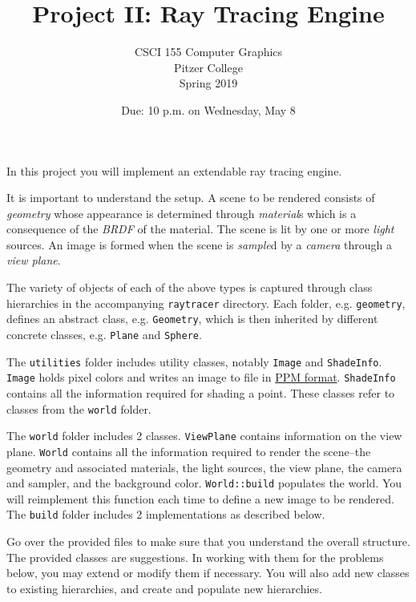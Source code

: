 \documentclass[addpoints]{exam}
\title{Project II: Ray Tracing Engine}
\author{CSCI 155 Computer Graphics\\Pitzer College\\Spring 2019}
\date{Due: 10 p.m. on Wednesday, May 8}
\begin{document}
\maketitle
\thispagestyle{empty}

In this project you will implement an extendable ray tracing engine.

It is important to understand the setup. A scene to be rendered consists of \emph{geometry} whose appearance is determined through \emph{material}s which is a consequence of the \emph{BRDF} of the material. The scene is lit by one or more \emph{light} sources. An image is formed when the scene is \emph{sample}d by a \emph{camera} through a \emph{view plane}.

The variety of objects of each of the above types is captured through class hierarchies in the accompanying \texttt{raytracer} directory. Each folder, e.g. \texttt{geometry}, defines an abstract class, e.g. \texttt{Geometry}, which is then inherited by different concrete classes, e.g. \texttt{Plane} and \texttt{Sphere}.

The \texttt{utilities} folder includes utility classes, notably \texttt{Image} and \texttt{ShadeInfo}. \texttt{Image} holds pixel colors and writes an image to file in \href{https://en.wikipedia.org/wiki/Netpbm_format#PBM_example}{PPM format}. \texttt{ShadeInfo} contains all the information required for shading a point. These classes refer to classes from the \texttt{world} folder.

The \texttt{world} folder includes 2 classes. \texttt{ViewPlane} contains information on the view plane. \texttt{World} contains all the information required to render the scene--the geometry and associated materials, the light sources, the view plane, the camera and sampler, and the background color. \texttt{World::build} populates the world. You will reimplement this function each time to define a new image to be rendered. The \texttt{build} folder includes 2 implementations as described below.

  Go over the provided files to make sure that you understand the overall structure. The provided classes are suggestions. In working with them for the problems below, you may extend or modify them if necessary. You will also add new classes to existing hierarchies, and create and populate new hierarchies.
\end{document}
